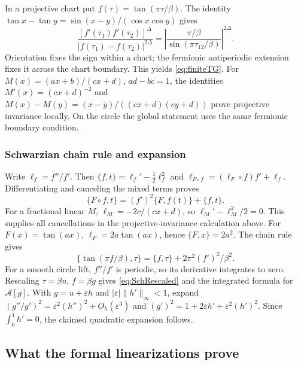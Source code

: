 \documentclass[11pt]{article}
\numberwithin{equation}{section}
\theoremstyle{exposition}
\theoremstyle{result}
\begin{document}
In a projective chart put $f(\tau)=\tan(\pi\tau/\beta)$. The identity $\tan x-\tan y=\sin(x-y)/(\cos x\cos y)$ gives
\begin{equation*}
\frac{[f'(\tau_1)f'(\tau_2)]^\Delta}{|f(\tau_1)-f(\tau_2)|^{2\Delta}}
=\left|\frac{\pi/\beta}{\sin(\pi\tau_{12}/\beta)}\right|^{2\Delta}.
\end{equation*}
Orientation fixes the sign within a chart; the fermionic antiperiodic extension fixes it across the chart boundary. This yields \eqref{eq:finiteTG}. For $M(x)=(ax+b)/(cx+d)$, $ad-bc=1$, the identities $M'(x)=(cx+d)^{-2}$ and $M(x)-M(y)=(x-y)/((cx+d)(cy+d))$ prove projective invariance locally. On the circle the global statement uses the same fermionic boundary condition.

\subsubsection{Schwarzian chain rule and expansion}
Write $\ell_f=f''/f'$. Then $\{f,t\}=\ell_f'-\tfrac12\ell_f^2$ and $\ell_{F\circ f}=(\ell_F\circ f)f'+\ell_f$. Differentiating and canceling the mixed terms proves
\begin{equation*}
\{F\circ f,t\}=(f')^2\{F,f(t)\}+\{f,t\}.
\end{equation*}
For a fractional linear $M$, $\ell_M=-2c/(cx+d)$, so $\ell_M'-\ell_M^2/2=0$. This supplies all cancellations in the projective-invariance calculation above. For $F(x)=\tan(ax)$, $\ell_F=2a\tan(ax)$, hence $\{F,x\}=2a^2$. The chain rule gives
\begin{equation*}
\{\tan(\pi f/\beta),\tau\}=\{f,\tau\}+2\pi^2(f')^2/\beta^2.
\end{equation*}
For a smooth circle lift, $f''/f'$ is periodic, so its derivative integrates to zero. Rescaling $\tau=\beta u$, $f=\beta g$ gives \eqref{eq:SchRescaled} and the integrated formula for $\mathcal A[g]$. With $g=u+\varepsilon h$ and $|\varepsilon|\|h'\|_\infty<1$, expand $(g''/g')^2=\varepsilon^2(h'')^2+O_h(\varepsilon^3)$ and $(g')^2=1+2\varepsilon h'+\varepsilon^2(h')^2$. Since $\int_0^1h'=0$, the claimed quadratic expansion follows.

\subsection{What the formal linearizations prove}\label{app:formalDetails}
\end{document}
